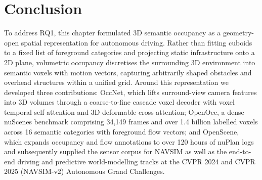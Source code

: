 \FloatBarrier
\section{Conclusion}\label{occnet:sec:summary}

To address RQ1, this chapter formulated 3D semantic occupancy as a geometry-open spatial representation for autonomous driving. Rather than fitting cuboids to a fixed list of foreground categories and projecting static infrastructure onto a 2D plane, volumetric occupancy discretises the surrounding 3D environment into semantic voxels with motion vectors, capturing arbitrarily shaped obstacles and overhead structures within a unified grid. Around this representation we developed three contributions: OccNet, which lifts surround-view camera features into 3D volumes through a coarse-to-fine cascade voxel decoder with voxel temporal self-attention and 3D deformable cross-attention; OpenOcc, a dense nuScenes benchmark comprising 34,149 frames and over 1.4 billion labelled voxels across 16 semantic categories with foreground flow vectors; and OpenScene, which expands occupancy and flow annotations to over 120 hours of nuPlan logs and subsequently supplied the sensor corpus for NAVSIM as well as the end-to-end driving and predictive world-modelling tracks at the CVPR 2024 and CVPR 2025 (NAVSIM-v2) Autonomous Grand Challenges.

